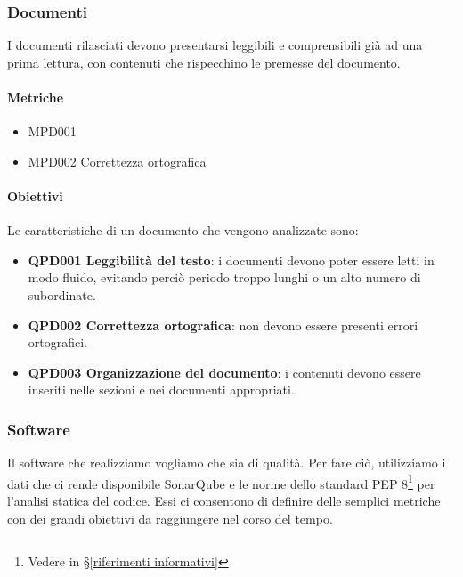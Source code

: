 	\subsubsection{Documenti}
	I documenti rilasciati devono presentarsi leggibili e comprensibili già ad una prima lettura, con contenuti che rispecchino le premesse del documento.

		\paragraph*{Metriche} 
		\begin{itemize}
			\item MPD001 
			\item MPD002 Correttezza ortografica
		\end{itemize} 
		
		\paragraph*{Obiettivi} 		
		Le caratteristiche di un documento che vengono analizzate sono:
		
		\begin{itemize}
			\item \textbf{QPD001 Leggibilità del testo}: i documenti devono poter essere letti in modo fluido, evitando perciò periodo troppo lunghi o un alto numero di subordinate.
			\item \textbf{QPD002 Correttezza ortografica}: non devono essere presenti errori ortografici.
			\item \textbf{QPD003 Organizzazione del documento}: i contenuti devono essere inseriti nelle sezioni e nei documenti appropriati.
		\end{itemize}

	\subsubsection{Software} \label{prodottosw}
	Il software che realizziamo vogliamo che sia di qualità.
	Per fare ciò, utilizziamo i dati che ci rende disponibile SonarQube e le norme dello standard PEP 8\footnote{Vedere in \S\ref{riferimenti informativi}} per l'analisi statica del codice.
	Essi ci consentono di definire delle semplici metriche con dei grandi obiettivi da raggiungere nel corso del tempo.

